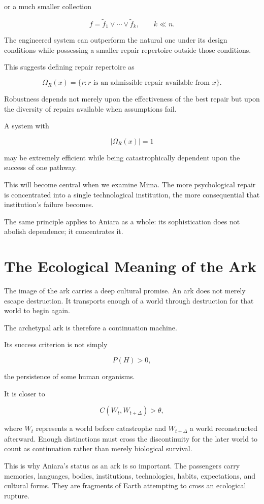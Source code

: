 \documentclass[11pt,oneside]{book}
\theoremstyle{definition}
\theoremstyle{remark}
\begin{document}
or a much smaller collection

\[
f
=
\tilde f_1\lor\cdots\lor\tilde f_k,
\qquad
k\ll n.
\]

The engineered system can outperform the natural one under its design conditions while possessing a smaller repair repertoire outside those conditions.

This suggests defining repair repertoire as

\[
\Omega_R(x)
=
\{
r:
r\text{ is an admissible repair available from }x
\}.
\]

Robustness depends not merely upon the effectiveness of the best repair but upon the diversity of repairs available when assumptions fail.

A system with

\[
|\Omega_R(x)|=1
\]

may be extremely efficient while being catastrophically dependent upon the success of one pathway.

This will become central when we examine Mima. The more psychological repair is concentrated into a single technological institution, the more consequential that institution's failure becomes.

The same principle applies to Aniara as a whole: its sophistication does not abolish dependence; it concentrates it.

\section{The Ecological Meaning of the Ark}

The image of the ark carries a deep cultural promise. An ark does not merely escape destruction. It transports enough of a world through destruction for that world to begin again.

The archetypal ark is therefore a continuation machine.

Its success criterion is not simply

\[
P(H)>0,
\]

the persistence of some human organisms.

It is closer to

\[
C(W_t,W_{t+\Delta})>\theta,
\]

where \(W_t\) represents a world before catastrophe and \(W_{t+\Delta}\) a world reconstructed afterward. Enough distinctions must cross the discontinuity for the later world to count as continuation rather than merely biological survival.

This is why Aniara's status as an ark is so important. The passengers carry memories, languages, bodies, institutions, technologies, habits, expectations, and cultural forms. They are fragments of Earth attempting to cross an ecological rupture.
\end{document}
